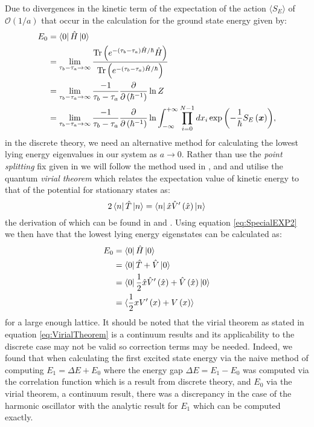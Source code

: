 \documentclass[12pt]{article}
\begin{document}
        Due to divergences in the kinetic term of the expectation of the action $\langle S_{E} \rangle$ of $\mathcal{O}\left(1/a\right) $\cite{creutz_freedman_1981} that occur in the calculation for the ground state energy given by:
        \begin{align}
            E_{0} & = \bra{0}\hat{H}\ket{0} \\
                  & = \lim_{\tau_b-\tau_a \rightarrow \infty} \frac{\text{Tr}\left(e^{-\left(\tau_b-\tau_a\right)\hat{H}/\hbar}\hat{H}\right)}{\text{Tr}\left(e^{-\left(\tau_b-\tau_a\right)\hat{H}/\hbar}\right)} \\
                  & = \lim_{\tau_b-\tau_a \rightarrow \infty} \frac{-1}{\tau_b-\tau_a} \frac{\partial}{\partial\left(\hbar^{-1}\right)}\ln{Z} \\
                  & = \lim_{\tau_b-\tau_a \rightarrow \infty} \frac{-1}{\tau_b-\tau_a} \frac{\partial}{\partial\left(\hbar^{-1}\right)}\ln \int^{+\infty}_{-\infty}\prod_{i=0}^{N-1}dx_i \exp{\left(-\frac{1}{\hbar}S_{E}\left(\bm{x}\right)\right)},
        \end{align}
        in the discrete theory, we need an alternative method for calculating the lowest lying energy eigenvalues in our system as $a\rightarrow 0$. Rather than use the \textit{point splitting} fix given in \cite{feynman_hibbs_1965} we will follow the method used in \cite{creutz_freedman_1981}, \cite{rodgers_raes} and \cite{slapik_serenone} and utilise the quantum \textit{virial theorem} which relates the expectation value of kinetic energy to that of the potential for stationary states as:
        \begin{equation}
            \label{eq:VirialTheorem}
            2\bra{n} \hat{T} \ket{n} = \bra{n} \hat{x} \hat{V}'\left(\hat{x}\right) \ket{n}
        \end{equation}
         the derivation of which can be found in \cite{binney_skinner_2015} and \cite{fock_1930}. Using equation \ref{eq:SpecialEXP2} we then have that the lowest lying energy eigenstates can be calculated as:
         \begin{align}
            E_0  & = \bra{0}\hat{H}\ket{0} \\
                 & = \bra{0}\hat{T}+\hat{V}\ket{0}\\
                 & = \bra{0}\frac{1}{2}\hat{x}\hat{V}'\left(\hat{x}\right)+\hat{V}\left(\hat{x}\right)\ket{0}\\
                 & = \langle \frac{1}{2}xV'\left(x\right) +  V\left(x\right) \rangle
         \end{align}
         for a large enough lattice. It should be noted that the virial theorem as stated in equation \ref{eq:VirialTheorem} is a continuum results and its applicability to the discrete case may not be valid so correction terms may be needed. Indeed, we found that when calculating the first excited state energy via the naive method of computing $E_1 = \Delta E + E_0$ where the energy gap $\Delta E = E_1 - E_0$ was computed via the correlation function which is a result from discrete theory, and $E_0$ via the virial theorem, a continuum result, there was a discrepancy in the case of the harmonic oscillator with the analytic result for $E_1$ which can be computed exactly.
        
\end{document}
